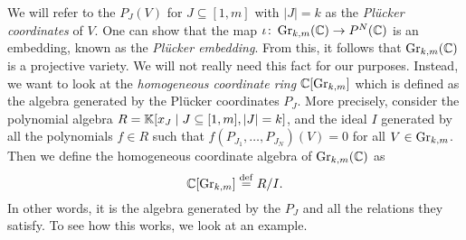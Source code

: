We will refer to the $P_J(V)$ for $J \subseteq [1,m]$ with $|J| = k$ as the
\emph{Plücker coordinates} of $V$. One can show that the map
$\iota \colon \operatorname{Gr}_{k, m}(\mathbb{C}) \to P^N(\mathbb{C})$ is an embedding, known as the
\emph{Plücker embedding}. From this, it follows that
$\operatorname{Gr}_{k,m}(\mathbb{C})$ is a projective variety. We will not really need this fact for our
purposes. Instead, we want to look at the \emph{homogeneous coordinate
	ring} $\mathbb{C}[\operatorname{Gr}_{k,m}]$ which is defined as the
algebra generated by the Plücker coordinates $P_J$. More precisely, consider the
polynomial algebra $R = \mathbb{K}[x_J \mid J\subseteq [1, m], |J| = k]$, and the ideal $I$
generated by all the polynomials $f \in R$ such that $f(P_{J_1}, \dots, P_{J_N})(V) =
	0$ for all $V \in \operatorname{Gr}_{k, m}$. Then we define the homogeneous coordinate algebra of
$\operatorname{Gr}_{k,m}(\mathbb{C})$ as
\begin{equation*}
	\mathbb{C}[\operatorname{Gr}_{k,m}] \overset{\mathrm{def}}{=} R / I.
\end{equation*}
%
In other words, it is the algebra generated by the $P_J$ and all the relations they
satisfy. To see how this works, we look at an example.
